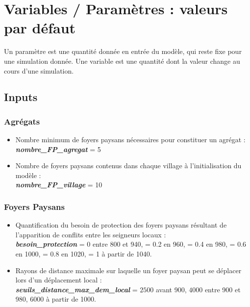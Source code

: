 \documentclass[a4paper,11pt]{article}
\begin{document}
{\clearpage

\section{Variables / Paramètres : valeurs par défaut}

Un paramètre est une quantité donnée en entrée du modèle, qui reste fixe pour une simulation donnée. Une variable est une quantité dont la valeur change au cours d'une simulation.

\subsection{Inputs}\label{inputs}

\subsubsection{Agrégats}
\begin{itemize}
	
	\item Nombre minimum de foyers paysans nécessaires pour constituer un agrégat :\\
	\textbf{\textit{nombre\_FP\_agregat}} = 5
	
	\item Nombre de foyers paysans contenus dans chaque village à l'initialisation du modèle :\\
	\textbf{\textit{nombre\_FP\_village}} = 10
	
\end{itemize}

\subsubsection{Foyers Paysans}
\begin{itemize}
	
	\item Quantification du besoin de protection des foyers paysans résultant de l'apparition de conflits entre les seigneurs locaux :\\ \textbf{\textit{besoin\_protection}} = 0 entre 800 et 940, = 0.2 en 960, = 0.4 en 980, = 0.6 en 1000, = 0.8 en 1020, = 1 à partir de 1040.
	
	\item Rayons de distance maximale sur laquelle un foyer paysan peut se déplacer lors d'un déplacement local :\\ \textbf{\textit{seuils\_distance\_max\_dem\_local}} = $2500$ avant 900, $4000$ entre 900 et 980, $6000$ à partir de 1000.
	

\end{itemize}}
\end{document}
